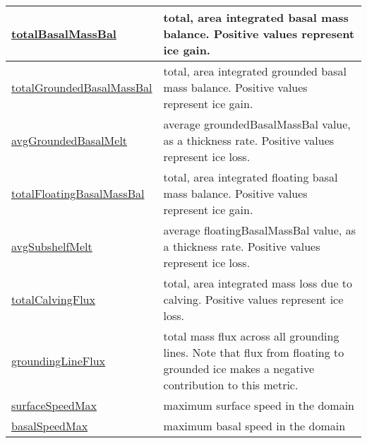 {\begin{center}
\begin{longtable}{| p{2.0in} | p{4.0in} |}
    \hline
    \hyperref[subsec:var_sec_globalStatsAM_totalBasalMassBal]{totalBasalMassBal} & total, area integrated basal mass balance. Positive values represent ice gain. \\
    \hline
    \hyperref[subsec:var_sec_globalStatsAM_totalGroundedBasalMassBal]{totalGroundedBasalMassBal} & total, area integrated grounded basal mass balance. Positive values represent ice gain. \\
    \hline
    \hyperref[subsec:var_sec_globalStatsAM_avgGroundedBasalMelt]{avgGroundedBasalMelt} & average groundedBasalMassBal value, as a thickness rate. Positive values represent ice loss. \\
    \hline
    \hyperref[subsec:var_sec_globalStatsAM_totalFloatingBasalMassBal]{totalFloatingBasalMassBal} & total, area integrated floating basal mass balance. Positive values represent ice gain. \\
    \hline
    \hyperref[subsec:var_sec_globalStatsAM_avgSubshelfMelt]{avgSubshelfMelt} & average floatingBasalMassBal value, as a thickness rate. Positive values represent ice loss. \\
    \hline
    \hyperref[subsec:var_sec_globalStatsAM_totalCalvingFlux]{totalCalvingFlux} & total, area integrated mass loss due to calving. Positive values represent ice loss. \\
    \hline
    \hyperref[subsec:var_sec_globalStatsAM_groundingLineFlux]{groundingLineFlux} & total mass flux across all grounding lines.  Note that flux from floating to grounded ice makes a negative contribution to this metric. \\
    \hline
    \hyperref[subsec:var_sec_globalStatsAM_surfaceSpeedMax]{surfaceSpeedMax} & maximum surface speed in the domain \\
    \hline
    \hyperref[subsec:var_sec_globalStatsAM_basalSpeedMax]{basalSpeedMax} & maximum basal speed in the domain \\
    \hline
\end{longtable}
\end{center}
}
